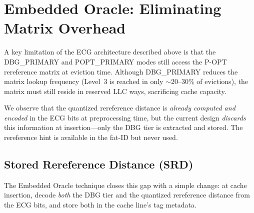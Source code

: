 \documentclass[conference]{IEEEtran}
\begin{document}

\section{Embedded Oracle: Eliminating Matrix Overhead}
\label{ECG:EmbeddedOracle}

A key limitation of the ECG architecture described above is that the DBG\_PRIMARY and POPT\_PRIMARY modes still access the P-OPT rereference matrix at eviction time. Although DBG\_PRIMARY reduces the matrix lookup frequency (Level~3 is reached in only $\sim$20--30\% of evictions), the matrix must still reside in reserved LLC ways, sacrificing cache capacity.

We observe that the quantized rereference distance is \emph{already computed and encoded} in the ECG bits at preprocessing time, but the current design \emph{discards} this information at insertion---only the DBG tier is extracted and stored. The rereference hint is available in the fat-ID but never used.

\subsection{Stored Rereference Distance (SRD)}

The Embedded Oracle technique closes this gap with a simple change: at cache insertion, decode \emph{both} the DBG tier and the quantized rereference distance from the ECG bits, and store both in the cache line's tag metadata.
\end{document}
